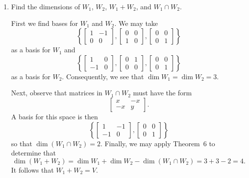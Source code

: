 \begin{enumerate}
\item Find the dimensions of $W_1$, $W_2$, $W_1 + W_2$, and
  $W_1\cap W_2$.
  \begin{solution}
    First we find bases for $W_1$ and $W_2$. We may take
    \begin{equation*}
      \left\{
        \begin{bmatrix}
          1 & -1 \\ 0 & 0
        \end{bmatrix},
        \begin{bmatrix}
          0 & 0 \\ 1 & 0
        \end{bmatrix},
        \begin{bmatrix}
          0 & 0 \\ 0 & 1
        \end{bmatrix}
      \right\}
    \end{equation*}
    as a basis for $W_1$ and
    \begin{equation*}
      \left\{
        \begin{bmatrix}
          1 & 0 \\ -1 & 0
        \end{bmatrix},
        \begin{bmatrix}
          0 & 1 \\ 0 & 0
        \end{bmatrix},
        \begin{bmatrix}
          0 & 0 \\ 0 & 1
        \end{bmatrix}
      \right\}
    \end{equation*}
    as a basis for $W_2$. Consequently, we see that
    $\dim W_1 = \dim W_2 = 3$.

    Next, observe that matrices in $W_1\cap W_2$ must have the form
    \begin{equation*}
      \begin{bmatrix}
        x & -x \\ -x & y
      \end{bmatrix}.
    \end{equation*}
    A basis for this space is then
    \begin{equation*}
      \left\{
        \begin{bmatrix}
          1 & -1 \\ -1 & 0
        \end{bmatrix},
        \begin{bmatrix}
          0 & 0 \\ 0 & 1
        \end{bmatrix}
      \right\}
    \end{equation*}
    so that $\dim(W_1 \cap W_2) = 2$. Finally, we may apply Theorem~6
    to determine that
    \begin{equation*}
      \dim(W_1 + W_2) = \dim W_1 + \dim W_2 - \dim(W_1\cap W_2)
      = 3 + 3 - 2 = 4.
    \end{equation*}
    It follows that $W_1 + W_2 = V$.
  \end{solution}
\end{enumerate}
